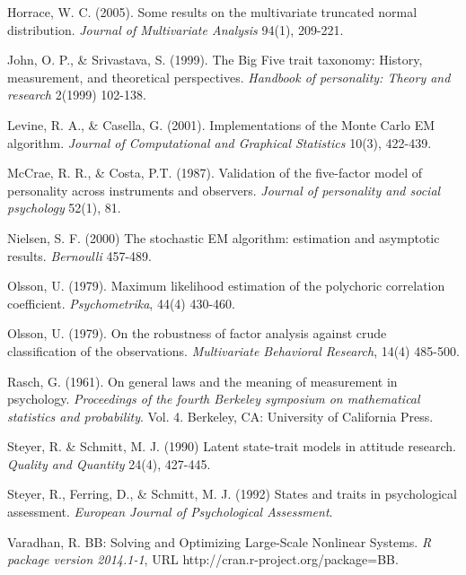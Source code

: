 \documentclass[12pt]{article}
\begin{document}
\begin{thebibliography}{99}

 Horrace, W. C. (2005). Some results on the multivariate truncated normal distribution. \textit{Journal of Multivariate Analysis} 94(1), 209-221.

  John, O. P., \& Srivastava, S. (1999).  The Big Five trait
taxonomy: History, measurement, and theoretical perspectives.  \textit{%
Handbook of personality: Theory and research} 2(1999) 102-138.

 Levine, R. A., \& Casella, G. (2001). Implementations of the Monte Carlo EM algorithm. \textit{Journal of Computational and Graphical Statistics} 10(3), 422-439.

  McCrae, R. R., \& Costa, P.T. (1987).  Validation of the
five-factor model of personality across instruments and observers.  \textit{%
Journal of personality and social psychology} 52(1), 81.

  Nielsen, S. F. (2000)  The stochastic EM algorithm:
estimation and asymptotic results.  \textit{Bernoulli} 457-489.

  Olsson, U. (1979).  Maximum likelihood estimation of the
polychoric correlation coefficient.  \textit{Psychometrika}, 44(4) 430-460.

  Olsson, U. (1979).  On the robustness of factor analysis against crude classification of the observations.  \textit{Multivariate Behavioral Research}, 14(4) 485-500.

 Rasch, G. (1961). On general laws and the meaning of measurement in psychology. \textit{Proceedings of the fourth Berkeley symposium on mathematical statistics and probability}. Vol. 4. Berkeley, CA: University of California Press.

  Steyer, R. \& Schmitt, M. J. (1990)  Latent state-trait
models in attitude research.  \textit{Quality and Quantity} 24(4), 427-445.

  Steyer, R., Ferring, D., \& Schmitt, M. J. (1992) 
States and traits in psychological assessment.  \textit{European Journal of
Psychological Assessment}.

  Varadhan, R.  BB: Solving and Optimizing Large-Scale Nonlinear Systems. \textit{R package version 2014.1-1}, URL \textrm{http://cran.r-project.org/package=BB}.


\end{thebibliography}
\end{document}
